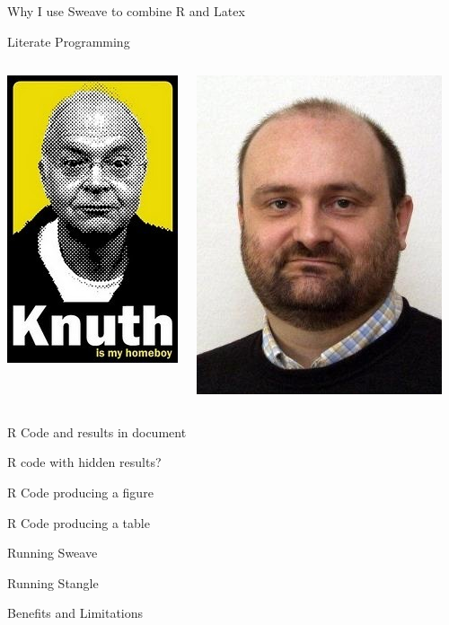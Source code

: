\documentclass{beamer}
\begin{document}
\begin{frame}{Why I use Sweave to combine R and Latex}
\begin{block}
   {Literate Programming}
\end{block}
 
\pause
\begin{columns}[t] 
\begin{center}
\includegraphics[scale=.4]{humor-donald-knuth-jokes-24307359}
\end{center}
\pause 
{}
\begin{center}
\includegraphics[scale=1.2]{Leisch}
\end{center}
\end{columns}
\end{frame}

\begin{frame} {R Code and results in document}
\end{frame}
\begin{frame} {R code with hidden results?}
\end{frame}

\begin{frame} {R Code producing a figure}
\end{frame}
\begin{frame} {R Code producing a table}
\end{frame}
\begin{frame} {Running Sweave}
\end{frame}

\begin{frame} {Running Stangle}
\end{frame}
\begin{frame} {Benefits and Limitations}
\end{frame}
\end{document}
